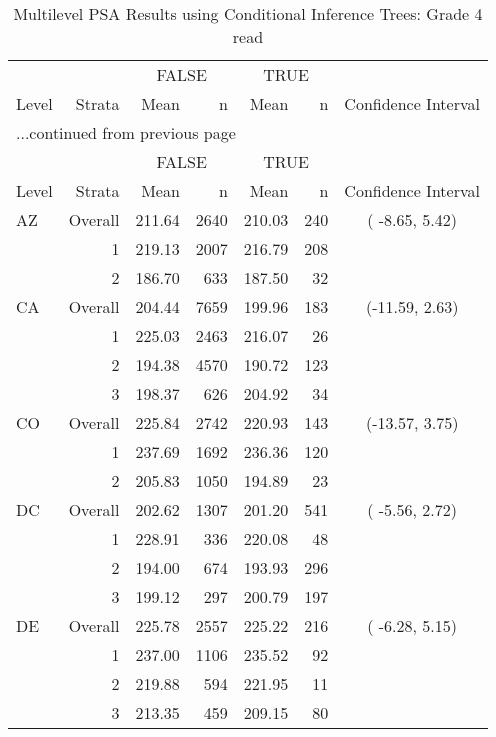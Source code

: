 \begin{longtable}{lrrr@{\extracolsep{.25cm}}rrc}
\caption{Multilevel PSA Results using Conditional Inference Trees: Grade 4 read} \\ 
   \hline & & \multicolumn{2}{c}{FALSE} & \multicolumn{2}{c}{TRUE} & \\ \cline{3-4} \cline{5-6} Level & Strata & Mean & n & Mean & n & Confidence Interval \\ \hline\endfirsthead \multicolumn{7}{l}{{...continued from previous page}}\\ \hline  & & \multicolumn{2}{c}{FALSE} & \multicolumn{2}{c}{TRUE} & \\ \cline{3-4} \cline{5-6} Level & Strata & Mean & n & Mean & n & Confidence Interval \\ \hline \endhead \endfoot \endlastfoot  \hline
AZ & Overall & 211.64 & 2640 & 210.03 & 240 & ( -8.65,   5.42) \\ 
   & 1 & 219.13 & 2007 & 216.79 & 208 &  \\ 
   & 2 & 186.70 & 633 & 187.50 &  32 &  \\ 
   \hline
CA & Overall & 204.44 & 7659 & 199.96 & 183 & (-11.59,   2.63) \\ 
   & 1 & 225.03 & 2463 & 216.07 &  26 &  \\ 
   & 2 & 194.38 & 4570 & 190.72 & 123 &  \\ 
   & 3 & 198.37 & 626 & 204.92 &  34 &  \\ 
   \hline
CO & Overall & 225.84 & 2742 & 220.93 & 143 & (-13.57,   3.75) \\ 
   & 1 & 237.69 & 1692 & 236.36 & 120 &  \\ 
   & 2 & 205.83 & 1050 & 194.89 &  23 &  \\ 
   \hline
DC & Overall & 202.62 & 1307 & 201.20 & 541 & ( -5.56,   2.72) \\ 
   & 1 & 228.91 & 336 & 220.08 &  48 &  \\ 
   & 2 & 194.00 & 674 & 193.93 & 296 &  \\ 
   & 3 & 199.12 & 297 & 200.79 & 197 &  \\ 
   \hline
DE & Overall & 225.78 & 2557 & 225.22 & 216 & ( -6.28,   5.15) \\ 
   & 1 & 237.00 & 1106 & 235.52 &  92 &  \\ 
   & 2 & 219.88 & 594 & 221.95 &  11 &  \\ 
   & 3 & 213.35 & 459 & 209.15 &  80 &  \\ 

\end{longtable}
